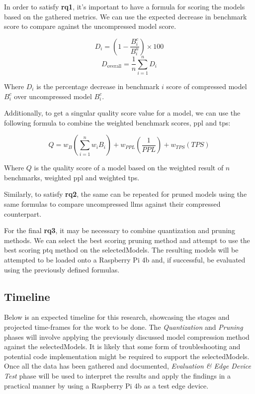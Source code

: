 \documentclass{ifacconf}
\begin{document}
	In order to satisfy \textbf{\gls{rq}1}, it's important to have a formula for scoring the models based on the gathered metrics. We can use the expected decrease in benchmark score to compare against the uncompressed model score. 
	
	$$
		D_i = \left(1 - \frac{B_i^c}{B_i^u}\right) \times 100
	$$
	$$
		D_{\text{overall}} = \frac{1}{n} \sum_{i=1}^{n} D_i
	$$
	
	Where $D_i$ is the percentage decrease in benchmark $i$ score of compressed model $B_i^c$ over uncompressed model $B_i^c$.
	
	Additionally, to get a singular quality score value for a model, we can use the following formula to combine the weighted benchmark scores, \gls{ppl} and \gls{tps}:
	
	$$
	Q = w_{B} \left( \sum_{i=1}^{n} w_i B_i \right) + w_{PPL} \left( \frac{1}{PPL} \right) + w_{TPS}(TPS) 
	$$
	
	Where $Q$ is the quality score of a model based on the weighted result of $n$ benchmarks, weighted \gls{ppl} and weighted \gls{tps}.
	
	Similarly, to satisfy \textbf{\gls{rq}2}, the same can be repeated for pruned models using the same formulas to compare uncompressed \glspl{llm} against their compressed counterpart.
	
	For the final \textbf{\gls{rq}3}, it may be necessary to combine quantization and pruning methods. We can select the best scoring pruning method and attempt to use the best scoring \gls{ptq} method on the \gls{selectedModels}. The resulting models will be attempted to be loaded onto a Raspberry Pi 4b and, if successful, be evaluated using the previously defined formulas.
	
	\subsection{Timeline}
	
	Below is an expected timeline for this research, showcasing the stages and projected time-frames for the work to be done. The \textit{Quantization} and \textit{Pruning} phases will involve applying the previously discussed model compression method against the \gls{selectedModels}. It is likely that some form of troubleshooting and potential code implementation might be required to support the \gls{selectedModels}. Once all the data has been gathered and documented, \textit{Evaluation \& Edge Device Test} phase will be used to interpret the results and apply the findings in a practical manner by using a Raspberry Pi 4b as a test edge device.
	
\end{document}
